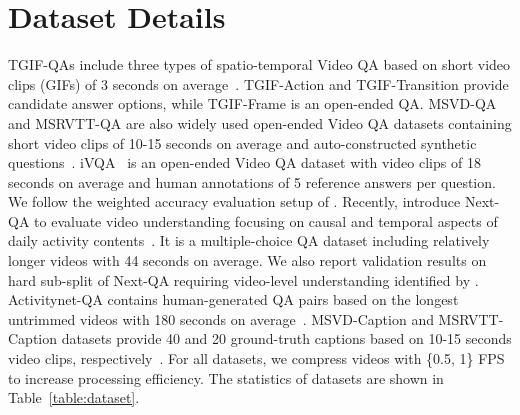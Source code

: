 \documentclass{article}
\begin{document}
\clearpage
\appendix

\section{Dataset Details}
\label{appendix:dataset}



TGIF-QAs include three types of spatio-temporal Video QA based on short video clips (GIFs) of 3 seconds on average~\cite{jang2017tgif}. TGIF-Action and TGIF-Transition provide candidate answer options, while TGIF-Frame is an open-ended QA. MSVD-QA and MSRVTT-QA are also widely used open-ended Video QA datasets containing short video clips of 10-15 seconds on average and auto-constructed synthetic questions~\cite{xu2017video}. iVQA~\cite{yang2021just} is an open-ended Video QA dataset with video clips of 18 seconds on average and human annotations of 5 reference answers per question. We follow the weighted accuracy evaluation setup of \citet{yang2021just}. Recently, \citet{xiao2021next} introduce Next-QA to evaluate video understanding focusing on causal and temporal aspects of daily activity contents~\cite{xiao2021next}. It is a multiple-choice QA dataset including relatively longer videos with 44 seconds on average. We also report validation results on hard sub-split of Next-QA requiring video-level understanding identified by \citet{buch2022revisiting}. Activitynet-QA contains human-generated QA pairs based on the longest untrimmed videos with 180 seconds on average~\cite{yu2019activitynet}. MSVD-Caption and MSRVTT-Caption datasets provide 40 and 20 ground-truth captions based on 10-15 seconds video clips, respectively~\cite{chen2011collecting, xu2016msr}. For all datasets, we compress videos with \{0.5, 1\} FPS to increase processing efficiency. The statistics of datasets are shown in Table~\ref{table:dataset}.
\end{document}
